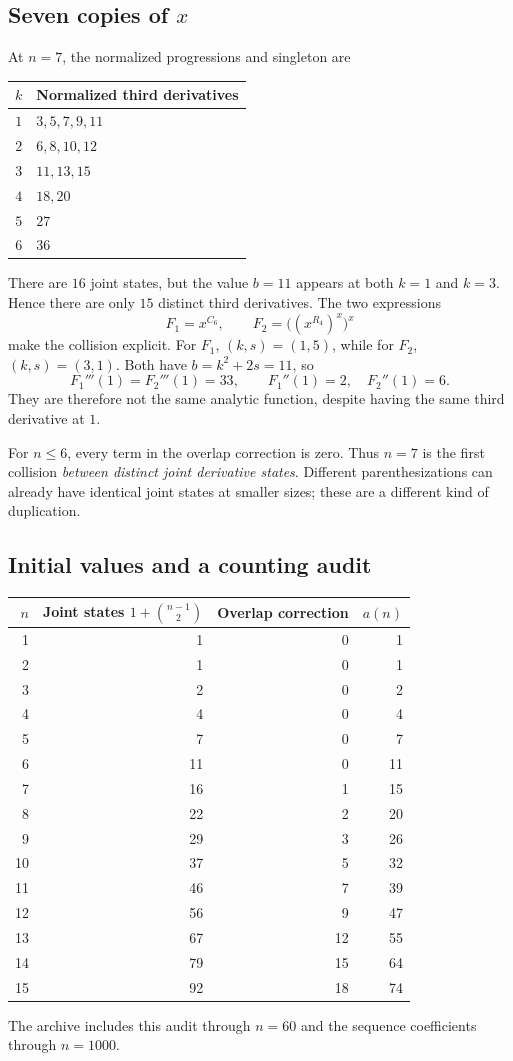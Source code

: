 \documentclass[11pt,letterpaper]{article}
\numberwithin{equation}{section}
\theoremstyle{definition}
\theoremstyle{remark}
\begin{document}
\subsection{Seven copies of \texorpdfstring{$x$}{x}}
At $n=7$, the normalized progressions and singleton are
\begin{center}
\begin{tabular}{@{}cl@{}}
\toprule
$k$ & Normalized third derivatives\\
\midrule
$1$ & $3,5,7,9,11$\\
$2$ & $6,8,10,12$\\
$3$ & $11,13,15$\\
$4$ & $18,20$\\
$5$ & $27$\\
$6$ & $36$\\
\bottomrule
\end{tabular}
\end{center}
There are $16$ joint states, but the value $b=11$ appears at both
$k=1$ and $k=3$. Hence there are only $15$ distinct third derivatives.
The two expressions
\[
 F_1=x^{C_6},\qquad F_2=\bigl((x^{R_4})^x\bigr)^x
\]
make the collision explicit. For $F_1$, $(k,s)=(1,5)$, while for
$F_2$, $(k,s)=(3,1)$. Both have $b=k^2+2s=11$, so
\[
 F_1'''(1)=F_2'''(1)=33,
 \qquad F_1''(1)=2,\quad F_2''(1)=6.
\]
They are therefore not the same analytic function, despite having the
same third derivative at $1$.

For $n\le6$, every term in the overlap correction is zero. Thus $n=7$
is the first collision \emph{between distinct joint derivative states}.
Different parenthesizations can already have identical joint states
at smaller sizes; these are a different kind of duplication.

\subsection{Initial values and a counting audit}
\begin{center}
\begin{tabular}{@{}rrrr@{}}
\toprule
$n$ & Joint states $1+\binom{n-1}{2}$ & Overlap correction & $a(n)$\\
\midrule
1&1&0&1\\
2&1&0&1\\
3&2&0&2\\
4&4&0&4\\
5&7&0&7\\
6&11&0&11\\
7&16&1&15\\
8&22&2&20\\
9&29&3&26\\
10&37&5&32\\
11&46&7&39\\
12&56&9&47\\
13&67&12&55\\
14&79&15&64\\
15&92&18&74\\
\bottomrule
\end{tabular}
\end{center}
The archive includes this audit through $n=60$ and the sequence
coefficients through $n=1000$.
\end{document}
